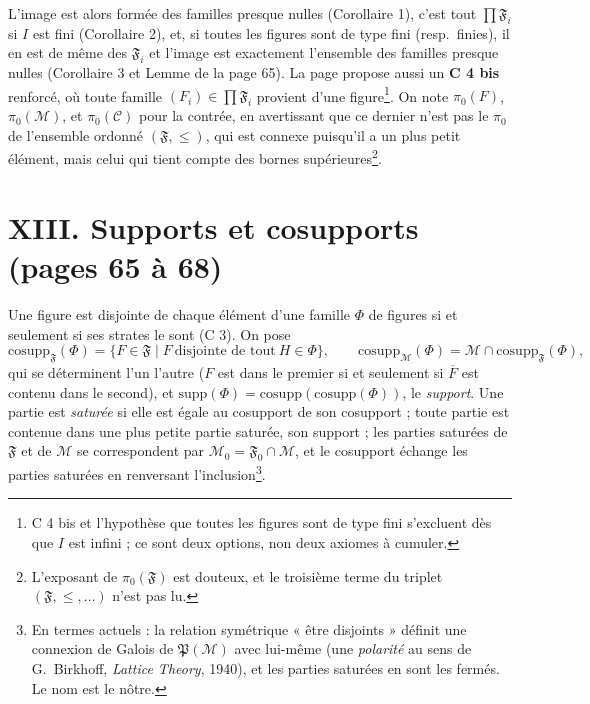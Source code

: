 \documentclass[11pt,a4paper]{article}
\begin{document}
L'image est alors formée des familles presque nulles (Corollaire 1), c'est tout
$\prod \mathfrak{F}_{i}$ si $I$ est fini (Corollaire 2), et, si toutes les
figures sont de type fini (resp.\ finies), il en est de même des
$\mathfrak{F}_{i}$ et l'image est exactement l'ensemble des familles presque
nulles (Corollaire 3 et Lemme de la page 65). La page propose aussi un
\textbf{C 4 bis} renforcé, où toute famille $(F_{i}) \in \prod \mathfrak{F}_{i}$
provient d'une figure\footnote{C 4 bis et l'hypothèse que toutes les figures
sont de type fini s'excluent dès que $I$ est infini ; ce sont deux options, non
deux axiomes à cumuler.}. On note $\pi_{0}(F)$, $\pi_{0}(\mathcal{M})$, et
$\pi_{0}(\mathcal{C})$ pour la contrée, en avertissant que ce dernier n'est pas
le $\pi_{0}$ de l'ensemble ordonné $(\mathfrak{F}, \leq)$, qui est connexe
puisqu'il a un plus petit élément, mais celui qui tient compte des bornes
supérieures\footnote{L'exposant de $\pi_{0}(\mathfrak{F})$ est douteux, et le
troisième terme du triplet $(\mathfrak{F}, \leq, \ldots)$ n'est pas lu.}.

\section*{XIII. Supports et cosupports (pages 65 à 68)}

Une figure est disjointe de chaque élément d'une famille $\Phi$ de figures si
et seulement si ses strates le sont (C 3). On pose
\[
\mathrm{cosupp}_{\mathfrak{F}}(\Phi) = \{F \in \mathfrak{F} \mid F \
\text{disjointe de tout}\ H \in \Phi\}, \qquad
\mathrm{cosupp}_{\mathcal{M}}(\Phi) = \mathcal{M} \cap
\mathrm{cosupp}_{\mathfrak{F}}(\Phi),
\]
qui se déterminent l'un l'autre ($F$ est dans le premier si et seulement si
$\overline{F}$ est contenu dans le second), et
$\mathrm{supp}(\Phi) = \mathrm{cosupp}(\mathrm{cosupp}(\Phi))$, le
\emph{support}. Une partie est \emph{saturée} si elle est égale au cosupport de
son cosupport ; toute partie est contenue dans une plus petite partie saturée,
son support ; les parties saturées de $\mathfrak{F}$ et de $\mathcal{M}$ se
correspondent par $\mathcal{M}_{0} = \mathfrak{F}_{0} \cap \mathcal{M}$, et le
cosupport échange les parties saturées en renversant l'inclusion\footnote{En
termes actuels : la relation symétrique « être disjoints » définit une
connexion de Galois de $\mathfrak{P}(\mathcal{M})$ avec lui-même (une
\emph{polarité} au sens de G.~Birkhoff, \emph{Lattice Theory}, 1940), et
les parties saturées en sont les fermés. Le nom est le nôtre.}.
\end{document}
